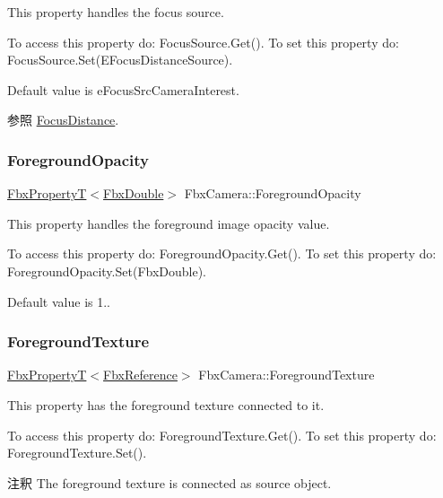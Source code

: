 This property handles the focus source.

To access this property do\+: Focus\+Source.\+Get(). To set this property do\+: Focus\+Source.\+Set(\+E\+Focus\+Distance\+Source).

Default value is e\+Focus\+Src\+Camera\+Interest. \begin{DoxySeeAlso}{参照}
\hyperlink{class_fbx_camera_af6165df26c7d25156163a3ed2a2f99c2}{Focus\+Distance}. 
\end{DoxySeeAlso}
\mbox{\label{class_fbx_camera_a95fe1a3dbd71e2503e7f4de5f14ea171}} 
\subsubsection{\texorpdfstring{Foreground\+Opacity}{ForegroundOpacity}}
{\footnotesize\ttfamily \hyperlink{class_fbx_property_t}{Fbx\+PropertyT}$<$\hyperlink{fbxtypes_8h_a171e72a1c46fc15c1a6c9c31948c1c5b}{Fbx\+Double}$>$ Fbx\+Camera\+::\+Foreground\+Opacity}

This property handles the foreground image opacity value.

To access this property do\+: Foreground\+Opacity.\+Get(). To set this property do\+: Foreground\+Opacity.\+Set(\+Fbx\+Double).

Default value is 1.. \mbox{\label{class_fbx_camera_aeb121a9199a538fa7825bc26d326b7f9}} 
\subsubsection{\texorpdfstring{Foreground\+Texture}{ForegroundTexture}}
{\footnotesize\ttfamily \hyperlink{class_fbx_property_t}{Fbx\+PropertyT}$<$\hyperlink{fbxtypes_8h_a44df6a2eec915cf27cd481e5c5e48a24}{Fbx\+Reference}$>$ Fbx\+Camera\+::\+Foreground\+Texture}

This property has the foreground texture connected to it.

To access this property do\+: Foreground\+Texture.\+Get(). To set this property do\+: Foreground\+Texture.\+Set().

\begin{DoxyRemark}{注釈}
The foreground texture is connected as source object. 
\end{DoxyRemark}
\mbox{\label{class_fbx_camera_ae032c4d73824601774f06ce4375943cd}} 
